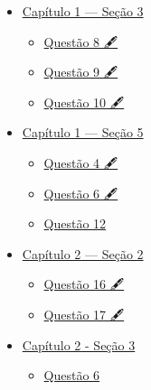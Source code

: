 \href{https://twitter.com/impression28}{}

\begin{itemize}
\tightlist
\item
  \protect\hyperlink{capuxedtulo-1--seuxe7uxe3o-3}{Capítulo 1 --- Seção
  3}

  \begin{itemize}
  \tightlist
  \item
    \protect\hyperlink{questuxe3o-8-}{Questão 8 🖋️}
  \item
    \protect\hyperlink{questuxe3o-9-}{Questão 9 🖋️}
  \item
    \protect\hyperlink{questuxe3o-10-}{Questão 10 🖋️}
  \end{itemize}
\item
  \protect\hyperlink{capuxedtulo-1--seuxe7uxe3o-5}{Capítulo 1 --- Seção
  5}

  \begin{itemize}
  \tightlist
  \item
    \protect\hyperlink{questuxe3o-4-}{Questão 4 🖋️}
  \item
    \protect\hyperlink{questuxe3o-6-}{Questão 6 🖋️}
  \item
    \protect\hyperlink{questuxe3o-12}{Questão 12}
  \end{itemize}
\item
  \protect\hyperlink{capuxedtulo-2--seuxe7uxe3o-2}{Capítulo 2 --- Seção
  2}

  \begin{itemize}
  \tightlist
  \item
    \protect\hyperlink{questuxe3o-16-}{Questão 16 🖋️}
  \item
    \protect\hyperlink{questuxe3o-17-}{Questão 17 🖋️}
  \end{itemize}
\item
  \protect\hyperlink{capuxedtulo-2---seuxe7uxe3o-3}{Capítulo 2 - Seção
  3}

  \begin{itemize}
  \tightlist
  \item
    \protect\hyperlink{questuxe3o-6}{Questão 6}
  \end{itemize}
\end{itemize}
